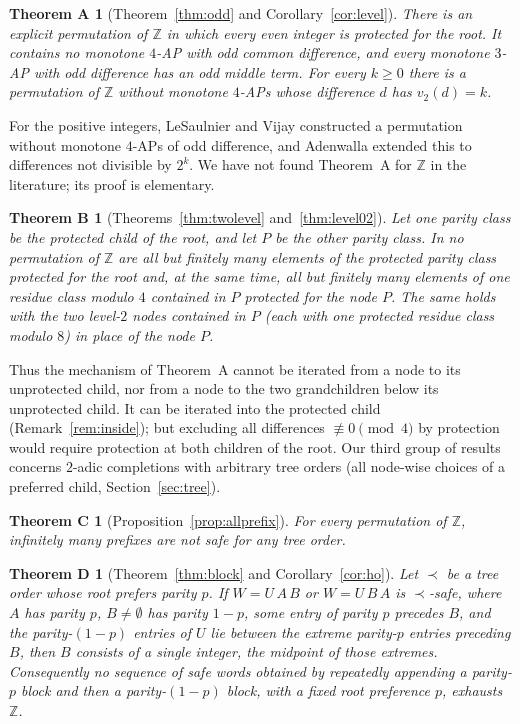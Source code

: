 \documentclass[11pt]{amsart}
\newtheorem*{theoremA}{Theorem A}
\newtheorem*{theoremB}{Theorem B}
\newtheorem*{theoremC}{Theorem C}
\newtheorem*{theoremD}{Theorem D}
\theoremstyle{definition}
\theoremstyle{remark}
\newcommand{\Z}{\mathbb{Z}}
\begin{document}
\begin{theoremA}[Theorem~\ref{thm:odd} and Corollary~\ref{cor:level}]
There is an explicit permutation of $\Z$ in which every even integer is protected for the root. It contains no monotone $4$-AP with odd common difference, and every monotone $3$-AP with odd difference has an odd middle term. For every $k\ge0$ there is a permutation of $\Z$ without monotone $4$-APs whose difference $d$ has $v_2(d)=k$.
\end{theoremA}

For the positive integers, LeSaulnier and Vijay \cite{LV11} constructed a permutation without monotone $4$-APs of odd difference, and Adenwalla \cite{Ad23} extended this to differences not divisible by $2^k$. We have not found Theorem~A for $\Z$ in the literature; its proof is elementary.

\begin{theoremB}[Theorems~\ref{thm:twolevel} and~\ref{thm:level02}]
Let one parity class be the protected child of the root, and let $P$ be the other parity class. In no permutation of $\Z$ are all but finitely many elements of the protected parity class protected for the root and, at the same time, all but finitely many elements of one residue class modulo $4$ contained in $P$ protected for the node $P$. The same holds with the two level-$2$ nodes contained in $P$ (each with one protected residue class modulo $8$) in place of the node $P$.
\end{theoremB}

Thus the mechanism of Theorem~A cannot be iterated from a node to its unprotected child, nor from a node to the two grandchildren below its unprotected child. It can be iterated into the protected child (Remark~\ref{rem:inside}); but excluding all differences $\not\equiv0\pmod4$ by protection would require protection at both children of the root. Our third group of results concerns $2$-adic completions with arbitrary tree orders (all node-wise choices of a preferred child, Section~\ref{sec:tree}).

\begin{theoremC}[Proposition~\ref{prop:allprefix}]
For every permutation of $\Z$, infinitely many prefixes are not safe for any tree order.
\end{theoremC}

\begin{theoremD}[Theorem~\ref{thm:block} and Corollary~\ref{cor:ho}]
Let $\prec$ be a tree order whose root prefers parity $p$. If $W=U\,A\,B$ or $W=U\,B\,A$ is $\prec$-safe, where $A$ has parity $p$, $B\neq\emptyset$ has parity $1-p$, some entry of parity $p$ precedes $B$, and the parity-$(1-p)$ entries of $U$ lie between the extreme parity-$p$ entries preceding $B$, then $B$ consists of a single integer, the midpoint of those extremes. Consequently no sequence of safe words obtained by repeatedly appending a parity-$p$ block and then a parity-$(1-p)$ block, with a fixed root preference $p$, exhausts $\Z$.
\end{theoremD}
\end{document}
